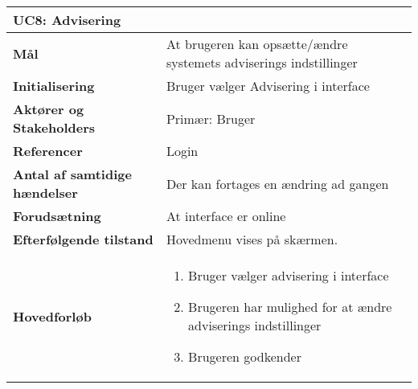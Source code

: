 \begin{table}[H] \centering
\begin{tabular}{|p{6cm}|p{8cm}|}
	\hline
\multicolumn{2}{|l|}{\textbf{UC8: Advisering}} \\\hline
\textbf{Mål}								
&At brugeren kan opsætte/ændre systemets adviserings indstillinger
 \\\hline
\textbf{Initialisering}					
&Bruger vælger Advisering i interface
 \\\hline
\textbf{Aktører og Stakeholders}			
&Primær: Bruger
 \\\hline
\textbf{Referencer}						
&Login
 \\\hline
\textbf{Antal af samtidige hændelser}	
&Der kan fortages en ændring ad gangen
 \\\hline
\textbf{Forudsætning}					
&At interface er online
 \\\hline
\textbf{Efterfølgende tilstand}			
&Hovedmenu vises på skærmen.
 \\\hline
\textbf{Hovedforløb}						
& 
\begin{enumerate}

\item Bruger vælger advisering i interface

\item Brugeren har mulighed for at ændre adviserings indstillinger

\item Brugeren godkender
 
\end{enumerate}
 \\\hline

	\end{tabular}
	\label{UC8} 
\end{table}
